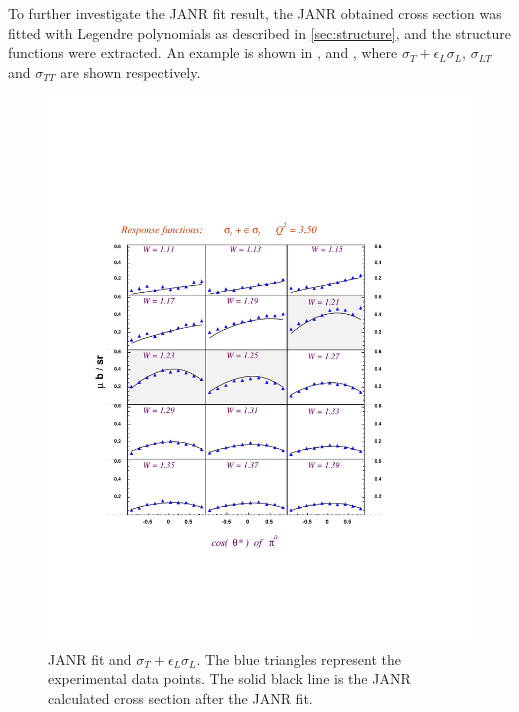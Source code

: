 \cia
To further investigate the JANR fit result, the JANR obtained cross section was fitted with Legendre polynomials
as described in \ref{sec:structure}, 
and the structure functions were extracted. An example is shown in , 
 and , where $\sigma_T+\epsilon_L\sigma_L$, $\sigma_{LT}$ and $\sigma_{TT}$ 
are shown respectively.

\begin{figure}[h]
 \includegraphics[width = 13cm, bb=-30 140 480 640]{analysis/img/lpt_Q23.50_Inn_L1}
  \caption[JANR fit of the cross section: $\sigma_T+\epsilon_L\sigma_L$]
{ JANR fit and  $\sigma_T+\epsilon_L\sigma_L$. The blue triangles represent the experimental data points. The solid black line
 is the JANR calculated cross section after the JANR fit.}
 \label{fig:lpt_Q23.50_Inn_L1}
\end{figure}

